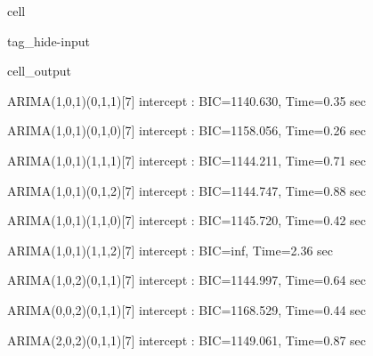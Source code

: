 \documentclass[letterpaper,10pt,english]{jupyterBook}
\begin{document}
\begin{sphinxuseclass}{cell}
\begin{sphinxuseclass}{tag_hide-input}
\begin{sphinxuseclass}{cell_output}
\begin{sphinxVerbatim}[commandchars=\\\{\}]
 ARIMA(1,0,1)(0,1,1)[7] intercept   : BIC=1140.630, Time=0.35 sec
\end{sphinxVerbatim}

\begin{sphinxVerbatim}[commandchars=\\\{\}]
 ARIMA(1,0,1)(0,1,0)[7] intercept   : BIC=1158.056, Time=0.26 sec
\end{sphinxVerbatim}

\begin{sphinxVerbatim}[commandchars=\\\{\}]
 ARIMA(1,0,1)(1,1,1)[7] intercept   : BIC=1144.211, Time=0.71 sec
\end{sphinxVerbatim}

\begin{sphinxVerbatim}[commandchars=\\\{\}]
 ARIMA(1,0,1)(0,1,2)[7] intercept   : BIC=1144.747, Time=0.88 sec
\end{sphinxVerbatim}

\begin{sphinxVerbatim}[commandchars=\\\{\}]
 ARIMA(1,0,1)(1,1,0)[7] intercept   : BIC=1145.720, Time=0.42 sec
\end{sphinxVerbatim}

\begin{sphinxVerbatim}[commandchars=\\\{\}]
 ARIMA(1,0,1)(1,1,2)[7] intercept   : BIC=inf, Time=2.36 sec
\end{sphinxVerbatim}

\begin{sphinxVerbatim}[commandchars=\\\{\}]
 ARIMA(1,0,2)(0,1,1)[7] intercept   : BIC=1144.997, Time=0.64 sec
\end{sphinxVerbatim}

\begin{sphinxVerbatim}[commandchars=\\\{\}]
 ARIMA(0,0,2)(0,1,1)[7] intercept   : BIC=1168.529, Time=0.44 sec
\end{sphinxVerbatim}

\begin{sphinxVerbatim}[commandchars=\\\{\}]
 ARIMA(2,0,2)(0,1,1)[7] intercept   : BIC=1149.061, Time=0.87 sec
\end{sphinxVerbatim}


\end{sphinxuseclass}
\end{sphinxuseclass}
\end{sphinxuseclass}
\end{document}
